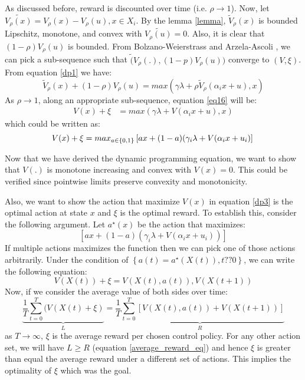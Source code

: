 \documentclass[conference]{IEEEtran}
\begin{document}
As discussed before, reward is discounted over time (i.e. $\rho \rightarrow 1$). Now, let $\tilde{V_{\rho}(x)} = V_{\rho}(x)-V_{\rho}(u), x\in X_i$. By the lemma \ref{lemma}, $\tilde{V}_{\rho}(x)$ is bounded Lipschitz, monotone, and convex with $\tilde{V_{\rho}(u)}=0$. Also, it is clear that $(1-\rho)V_{\rho}(u)$ is bounded. From Bolzano-Weierstrass \cite{bartle2000} and Arzela-Ascoli \cite{poppe1974}, we can pick a sub-sequence such that $\tilde({V}_{\rho}(.), (1-p)V_{\rho}(u))$ converge to $(V, \xi)$. From equation \ref{dp1} we have:
\begin{equation}
    \label{eq16}
    \tilde{V}_{\rho}(x) + (1-\rho)V_{\rho}(u)=max(\gamma \lambda + \rho \tilde{V}_{\rho}(\alpha_{i}x+u), x)
\end{equation}
As $\rho \rightarrow 1$, along an appropriate sub-sequence, equation \ref{eq16} will be:
\begin{eqnarray}
    \label{dp2}
  V(x) + \xi & = max(\gamma \lambda + V(\alpha_i x + u), x) 
\end{eqnarray}
which could be written as:
\begin{equation}
    \label{dp3}
    V(x) + \xi = max_{a\in\left\{0,1\right \}} \left [ ax + (1-a)(\gamma_{i}\lambda + V(\alpha_{i}x+u_{i})\right ] \\ 
\end{equation}

Now that we have derived the dynamic programming equation, we want to show that $V(.)$ is monotone increasing and convex with $V(x)=0$. This could be verified since pointwise limits preserve convexity and monotonicity.

Also, we want to show the action that maximize $V(x)$ in equation \ref{dp3} is the optimal action at state $x$ and $\xi$ is the optimal reward. To establish this, consider the following argument. Let $a^{\star}(x)$ be the action that maximizes:
\begin{equation}
    \left [ ax + (1-a) (\gamma_i \lambda + V(\alpha_i x + u_i)) \right]
\end{equation}
If multiple actions maximizes the function then we can pick one of those actions arbitrarily.
Under the condition of $\left \{a(t)=a^{\star}(X(t)), t ?? 0 \right \}$, we can write the following equation:
\begin{equation}
    V(X(t))+\xi = V(X(t),a(t)), V(X(t+1))
\end{equation}
Now, if we consider the average value of both sides over time:
\begin{equation}
    \label{average_reward_eq}
    \underbrace{\frac{1}{T} \sum_{t=0}^{T}(V(X(t)+\xi)}_{L} = \underbrace{\frac{1}{T} \sum_{t=0}^{T}\left [V(X(t),a(t))+V(X(t+1)) \right ]}_{R}
\end{equation}
as $T\rightarrow \infty$, $\xi$ is the average reward per chosen control policy. For any other action set, we will have $L \geq R$ (equation \ref{average_reward_eq}) and hence $\xi$ is greater than equal the average reward under a different set of actions. This implies the optimality of $\xi$ which was the goal.
\end{document}
